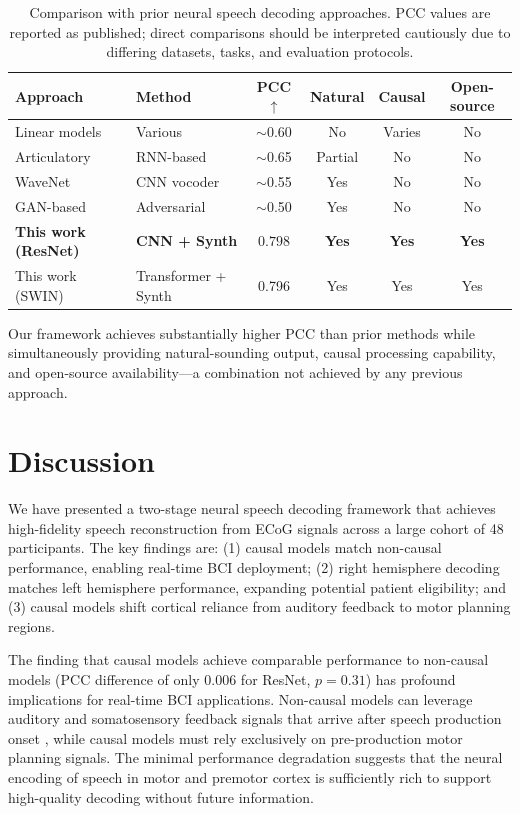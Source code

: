 \documentclass[11pt]{article}
\begin{document}
\begin{table}[H]
\centering
\caption{Comparison with prior neural speech decoding approaches. PCC values are reported as published; direct comparisons should be interpreted cautiously due to differing datasets, tasks, and evaluation protocols.}
\label{tab:prior}
\begin{tabular}{llcccc}
\toprule
\textbf{Approach} & \textbf{Method} & \textbf{PCC} $\uparrow$ & \textbf{Natural} & \textbf{Causal} & \textbf{Open-source} \\
\midrule
Linear models & Various & $\sim$0.60 & No & Varies & No \\
Articulatory & RNN-based & $\sim$0.65 & Partial & No & No \\
WaveNet & CNN vocoder & $\sim$0.55 & Yes & No & No \\
GAN-based & Adversarial & $\sim$0.50 & Yes & No & No \\
\textbf{This work (ResNet)} & \textbf{CNN + Synth} & $\mathbf{0.798}$ & \textbf{Yes} & \textbf{Yes} & \textbf{Yes} \\
This work (SWIN) & Transformer + Synth & 0.796 & Yes & Yes & Yes \\
\bottomrule
\end{tabular}
\end{table}

Our framework achieves substantially higher PCC than prior methods while simultaneously providing natural-sounding output, causal processing capability, and open-source availability---a combination not achieved by any previous approach.

\section{Discussion}

We have presented a two-stage neural speech decoding framework that achieves high-fidelity speech reconstruction from ECoG signals across a large cohort of 48 participants. The key findings are: (1) causal models match non-causal performance, enabling real-time BCI deployment; (2) right hemisphere decoding matches left hemisphere performance, expanding potential patient eligibility; and (3) causal models shift cortical reliance from auditory feedback to motor planning regions.

The finding that causal models achieve comparable performance to non-causal models (PCC difference of only 0.006 for ResNet, $p = 0.31$) has profound implications for real-time BCI applications. Non-causal models can leverage auditory and somatosensory feedback signals that arrive after speech production onset \citep{hickok2007}, while causal models must rely exclusively on pre-production motor planning signals. The minimal performance degradation suggests that the neural encoding of speech in motor and premotor cortex is sufficiently rich to support high-quality decoding without future information.
\end{document}
